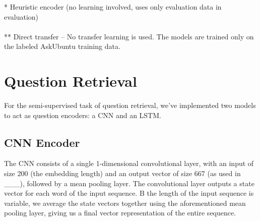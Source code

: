 \documentclass[12pt]{article}
\begin{document}
\begin{center}
	\end{center}
	* Heuristic encoder (no learning involved, uses only evaluation data in evaluation) \\\\
	** Direct transfer -- No transfer learning is used. The models are trained only on the labeled AskUbuntu training data.

\section{Question Retrieval}
For the semi-supervised task of question retrieval, we've implemented two models to act as question encoders: a CNN and an LSTM.

\subsection{CNN Encoder}
The CNN consists of a single 1-dimensional convolutional layer, with an input of size 200 (the embedding length) and an output vector of size 667 (as used in \_\_\_), followed by a mean pooling layer. The convolutional layer outputs a state vector for each word of the input sequence. B the length of the input sequence is variable, we average the state vectors together using the aforementioned mean pooling layer, giving us a final vector representation of the entire sequence.
\end{document}
